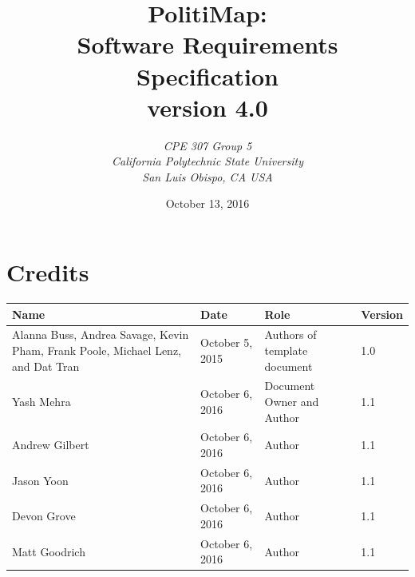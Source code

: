 \documentclass[12pt,oneside,letterpaper]{article}
\title{\bfseries PolitiMap: \\
  Software Requirements Specification\\
  version 4.0}
\author {\emph{CPE 307 Group 5}\\
  \emph{California Polytechnic State University}\\
  \emph{San Luis Obispo, CA USA}}
\date{October 13, 2016}
\begin{document}
\thispagestyle{empty}\maketitle
\newpage

\tableofcontents
\newpage

\section*{Credits}
\begin{tabu}{|X[.75]|l|X|l|}
  \hline
  \textbf{Name} & \textbf{Date} & \textbf{Role} & \textbf{Version} \\
  \hline
  Alanna Buss, Andrea Savage, Kevin Pham, Frank Poole, Michael Lenz, and Dat Tran & October 5, 2015 & Authors of template document & 1.0 \\
  \hline
  Yash Mehra & October 6, 2016 & Document Owner and Author & 1.1 \\
  \hline
  Andrew Gilbert & October 6, 2016 & Author & 1.1 \\
  \hline
  Jason Yoon & October 6, 2016 & Author & 1.1 \\
  \hline
  Devon Grove & October 6, 2016 & Author & 1.1 \\
  \hline
  Matt Goodrich & October 6, 2016 & Author & 1.1 \\
  \hline
\end{tabu}
\end{document}
